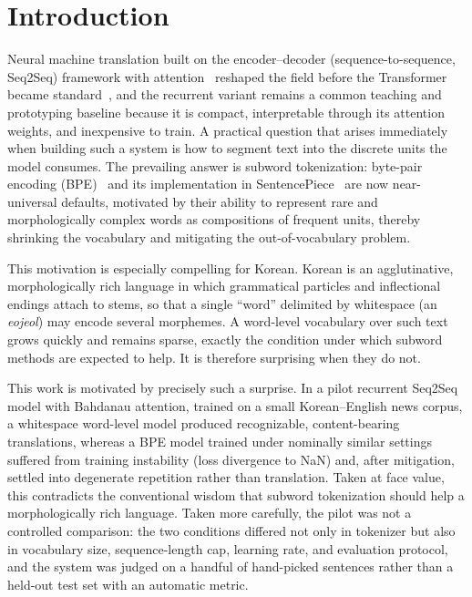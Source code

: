 \documentclass[conference]{IEEEtran}
\begin{document}
\section{Introduction}
Neural machine translation built on the encoder--decoder
(sequence-to-sequence, Seq2Seq) framework with attention~\cite{sutskever2014,
cho2014, bahdanau2015, luong2015} reshaped the field before the Transformer
became standard~\cite{vaswani2017}, and the recurrent variant remains a common
teaching and prototyping baseline because it is compact, interpretable through
its attention weights, and inexpensive to train. A practical question that
arises immediately when building such a system is how to segment text into the
discrete units the model consumes. The prevailing answer is subword
tokenization: byte-pair encoding (BPE)~\cite{sennrich2016} and its
implementation in SentencePiece~\cite{kudo2018spm} are now near-universal
defaults, motivated by their ability to represent rare and morphologically
complex words as compositions of frequent units, thereby shrinking the
vocabulary and mitigating the out-of-vocabulary problem.

This motivation is especially compelling for Korean. Korean is an
agglutinative, morphologically rich language in which grammatical particles and
inflectional endings attach to stems, so that a single ``word'' delimited by
whitespace (an \emph{eojeol}) may encode several morphemes. A word-level
vocabulary over such text grows quickly and remains sparse, exactly the
condition under which subword methods are expected to help. It is therefore
surprising when they do not.

This work is motivated by precisely such a surprise. In a pilot recurrent
Seq2Seq model with Bahdanau attention, trained on a small Korean--English news
corpus, a whitespace word-level model produced recognizable, content-bearing
translations, whereas a BPE model trained under nominally similar settings
suffered from training instability (loss divergence to NaN) and, after
mitigation, settled into degenerate repetition rather than translation. Taken at
face value, this contradicts the conventional wisdom that subword tokenization
should help a morphologically rich language. Taken more carefully, the pilot
was not a controlled comparison: the two conditions differed not only in
tokenizer but also in vocabulary size, sequence-length cap, learning rate, and
evaluation protocol, and the system was judged on a handful of hand-picked
sentences rather than a held-out test set with an automatic metric.
\end{document}
